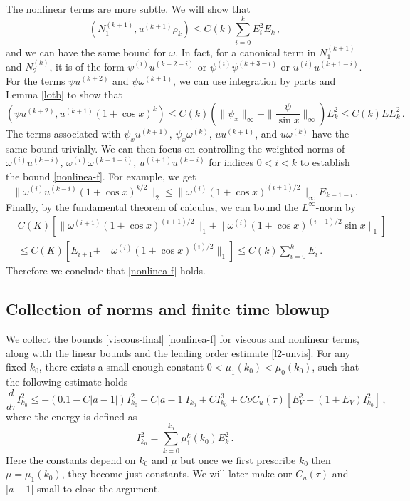 \documentclass[12pt]{caltech_thesis}
\numberwithin{equation}{section}
\begin{document}
    The nonlinear terms are more subtle. We will show that \begin{equation}\label{nonlinea-f}
        (N_1^{(k+1)},u^{(k+1)}\rho_k)\leq  C(k)\sum_{i=0}^{k}E_i^2E_k\,,
    \end{equation}
    and we can have the same bound for $\omega$.
    In fact, for a canonical term in $N_1^{(k+1)}$ and $N_2^{(k)}$, it is of the form $\psi^{(i)}u^{(k+2-i)}$ or $\psi^{(i)}\psi^{(k+3-i)}$ or $u^{(i)}u^{(k+1-i)}.$ For the terms $\psi u^{(k+2)}$ and $\psi \omega^{(k+1)}$, we can use integration by parts and Lemma \ref{lotb} to show that  $$(\psi u^{(k+2)},u^{(k+1)}(1+\cos x)^k)\leq C(k)(\|\psi_x\|_{\infty}+\|\frac{\psi}{\sin x}\|_{\infty})E_k^2\leq C(k)E E_k^2\,.$$
    The terms associated with $\psi_x u^{(k+1)}$, $\psi_x \omega^{(k)}$, $u u^{(k+1)}$, and $u \omega^{(k)}$  have the same bound trivially. We can then focus on controlling the weighted norms of $\omega^{(i)}u^{(k-i)}$, $\omega^{(i)}\omega^{(k-1-i)}$, $u^{(i+1)}u^{(k-i)}$ for indices $0<i<k$ to establish the bound \eqref{nonlinea-f}. For example, we get
    $$\|\omega^{(i)}u^{(k-i)}(1+\cos x)^{k/2}\|_{2}\leq \|\omega^{(i)}(1+\cos x)^{(i+1)/2}\|_{\infty}E_{k-1-i}\,.$$
    Finally, by the fundamental theorem of calculus, we can bound the $L^{\infty}$-norm by  $$\begin{aligned}
        & C(K)[\|\omega^{(i+1)}(1+\cos x)^{(i+1)/2}\|_{1}+\|\omega^{(i)}(1+\cos x)^{(i-1)/2}\sin x\|_{1}]\\&\leq C(K)[E_{i+1}+\|\omega^{(i)}(1+\cos x)^{(i)/2}\|_{1}]\leq C(k)\sum_{i=0}^{k}E_i\,.
    \end{aligned}
        $$
        Therefore we conclude that \eqref{nonlinea-f} holds.
\subsection{Collection of norms and finite time blowup}
We collect the bounds \eqref{viscous-final} \eqref{nonlinea-f} for viscous and nonlinear terms, along with the linear bounds and the leading order estimate \eqref{l2-unvis}. For any fixed ${k_0}$, there exists a small enough constant $0<\mu_1({k_0})<\mu_0({k_0})$, such that the following estimate holds
$$\frac{d}{d\tau}I_{k_0}^2\leq -(0.1-C|a-1|)I_{k_0}^2+C|a-1|I_{k_0}+CI_{k_0}^3+C\nu C_u(\tau)[E_V^2+(1+E_V)I_{k_0}^2]\,,$$
where the energy is defined as $$I_{k_0}^2=\sum_{k=0}^{k_0}\mu_1^k({k_0})E_k^2\,.$$
Here the constants depend on $k_0$ and $\mu$ but once we first prescribe $k_0$ then $\mu=\mu_1({k_0})$, they become just constants. We will later make our $C_u(\tau)$ and $|a-1|$ small to close the argument.
    
\end{document}
